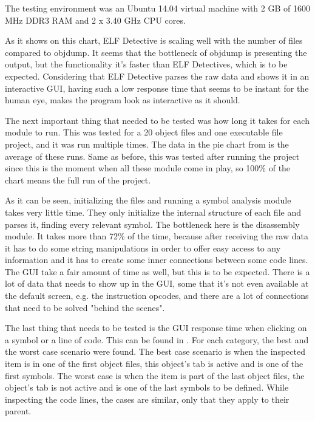 The testing environment was an Ubuntu 14.04 virtual machine with 2 GB of 1600 MHz DDR3 RAM and 2 x 3.40 GHz CPU cores. 

As it shows on this chart, ELF Detective is scaling well with the number of files compared to objdump. It seems that the bottleneck of objdump is presenting the output, but the functionality it’s faster than ELF Detectives, which is to be expected. Considering that ELF Detective parses the raw data and shows it in an interactive GUI, having such a low response time that seems to be instant for the human eye, makes the program look as interactive as it should.

The next important thing that needed to be tested was how long it takes for each module to run. This was tested for a 20 object files and one executable file project, and it was run multiple times. The data in the pie chart from  is the average of these runs. Same as before, this was tested after running the project since this is the moment when all these module come in play, so 100\% of the chart means the full run of the project.


As it can be seen, initializing the files and running a symbol analysis module takes very little time. They only initialize the internal structure of each file and parses it, finding every relevant symbol. The bottleneck here is the disassembly module. It takes more than 72\% of the time, because after receiving the raw data it has to do some string manipulations in order to offer easy access to any information and it has to create some inner connections between some code lines. The GUI take a fair amount of time as well, but this is to be expected. There is a lot of data that needs to show up in the GUI, some that it’s not even available at the default screen, e.g. the instruction opcodes, and there are a lot of connections that need to be solved "behind the scenes".

The last thing that needs to be tested is the GUI response time when clicking on a symbol or a line of code. This can be found in . For each category, the best and the worst case scenario were found. The best case scenario is when the inspected item is in one of the first object files, this object’s tab is active and is one of the first symbols. The worst case is when the item is part of the last object files, the object’s tab is not active and is one of the last symbols to be defined. While inspecting the code lines, the cases are similar, only that they apply to their parent.


